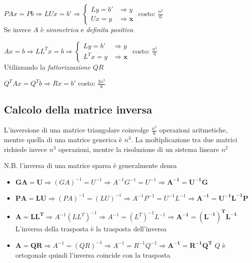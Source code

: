 \documentclass[openany]{book}
\begin{document}
$PAx=Pb \Rightarrow LUx=b' \Rightarrow \left\{ \begin{array}{ll} Ly=b' & \Rightarrow y \\ Ux = y & \Rightarrow \boldsymbol{x} \end{array}\right.$ \qquad costo: $\frac{n^3}{6}$
\\

Se invece $A$ è \textit{simmetrica} e \textit{definita positiva}

$Ax=b \Rightarrow LL^Tx=b \Rightarrow \left\{ \begin{array}{ll} Ly=b' & \Rightarrow y \\ L^Tx = y & \Rightarrow \boldsymbol{x} \end{array}\right.$ \qquad costo: $\frac{n^3}{6}$
\\

Utilizzando la \textit{fattorizzazione $QR$}

$Q^TAx=Q^Tb \Rightarrow Rx=b'$ \qquad costo: $\frac{2n^3}{6}$
\subsection{Calcolo della matrice inversa}

L'inversione di una matrice triangolare coinvolge $\frac{n^3}{6}$ operazioni aritmetiche, mentre quella di una matrice generica è $n^3$. La moltiplicazione tra due matrici richiede invece $n^3$ operazioni, mentre la risoluzione di un sistema lineare $n^2$

N.B. l'inversa di una matrice sparsa è generalmente densa

\begin{itemize}
	\item $\boldsymbol{GA=U}\Rightarrow (GA)^{-1}=U^{-1}\Rightarrow A^{-1}G^{-1}=U^{-1}\Rightarrow \boldsymbol{A^{-1}=U^{-1}G}$
	\item $\boldsymbol{PA=LU} \Rightarrow (PA)^{-1}=(LU)^{-1}\Rightarrow A^{-1}P^{-1}=U^{-1}L^{-1}\Rightarrow \boldsymbol{A^{-1}=U^{-1}L^{-1}P}$
	\item $\boldsymbol{A=LL^T}\Rightarrow A^{-1}(LL^T)^{-1}\Rightarrow A^{-1}=(L^T)^{-1}L^{-1} \Rightarrow \boldsymbol{A^{-1}=(L^{-1})^TL^{-1}}$ \quad L'inversa della trasposta è la trasposta dell'inversa 
	\item $\boldsymbol{A=QR}\Rightarrow A^{-1}=(QR)^{-1}\Rightarrow A^{-1}=R^{-1}Q^{-1} \Rightarrow \boldsymbol{A^{-1}=R^{-1}Q^T}$ \quad $Q$ è ortogonale quindi l'inversa coincide con la trasposta
\end{itemize}
\end{document}
